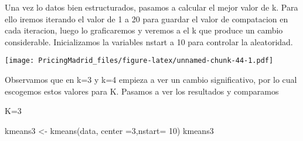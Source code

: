 \documentclass[
]{article}
\newenvironment{Shaded}{\begin{snugshade}}{\end{snugshade}}
\newcommand{\AttributeTok}[1]{\textcolor[rgb]{0.77,0.63,0.00}{#1}}
\newcommand{\ControlFlowTok}[1]{\textcolor[rgb]{0.13,0.29,0.53}{\textbf{#1}}}
\newcommand{\DecValTok}[1]{\textcolor[rgb]{0.00,0.00,0.81}{#1}}
\newcommand{\FunctionTok}[1]{\textcolor[rgb]{0.00,0.00,0.00}{#1}}
\newcommand{\NormalTok}[1]{#1}
\newcommand{\OtherTok}[1]{\textcolor[rgb]{0.56,0.35,0.01}{#1}}
\newcommand{\SpecialCharTok}[1]{\textcolor[rgb]{0.00,0.00,0.00}{#1}}
\newcommand{\StringTok}[1]{\textcolor[rgb]{0.31,0.60,0.02}{#1}}
\begin{document}
Una vez lo datos bien estructurados, pasamos a calcular el mejor valor
de k. Para ello iremos iterando el valor de 1 a 20 para guardar el valor
de compatacion en cada iteracion, luego lo graficaremos y veremos a el k
que produce un cambio considerable. Inicializamos la variables nstart a
10 para controlar la aleatoridad.

\begin{Shaded}
\end{Shaded}

\texttt{[image: PricingMadrid\_files/figure-latex/unnamed-chunk-44-1.pdf]}

Observamos que en k=3 y k=4 empieza a ver un cambio significativo, por
lo cual escogemos estos valores para K. Pasamos a ver los resultados y
comparamos

K=3

\begin{Shaded}
\begin{Highlighting}[]
\NormalTok{kmeans3 }\OtherTok{\textless{}{-}} \FunctionTok{kmeans}\NormalTok{(data, }\AttributeTok{center =}\DecValTok{3}\NormalTok{,}\AttributeTok{nstart=} \DecValTok{10}\NormalTok{)}
\NormalTok{kmeans3}
\end{Highlighting}
\end{Shaded}
\end{document}
